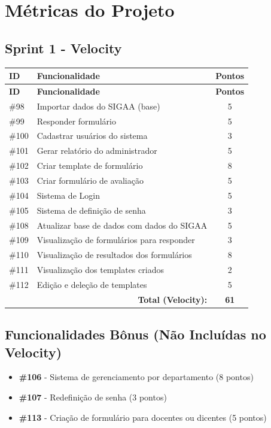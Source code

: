 \documentclass[a4paper,12pt]{article}
\begin{document}
\section{Métricas do Projeto}

\subsection{Sprint 1 - Velocity}
\begin{longtable}{|l|p{6cm}|c|}
\hline
\textbf{ID} & \textbf{Funcionalidade} & \textbf{Pontos} \\
\hline
\endfirsthead
\hline
\textbf{ID} & \textbf{Funcionalidade} & \textbf{Pontos} \\
\hline
\endhead
\#98 & Importar dados do SIGAA (base) & 5 \\
\#99 & Responder formulário & 5 \\
\#100 & Cadastrar usuários do sistema & 3 \\
\#101 & Gerar relatório do administrador & 5 \\
\#102 & Criar template de formulário & 8 \\
\#103 & Criar formulário de avaliação & 5 \\
\#104 & Sistema de Login & 5 \\
\#105 & Sistema de definição de senha & 3 \\
\#108 & Atualizar base de dados com dados do SIGAA & 5 \\
\#109 & Visualização de formulários para responder & 3 \\
\#110 & Visualização de resultados dos formulários & 8 \\
\#111 & Visualização dos templates criados & 2 \\
\#112 & Edição e deleção de templates & 5 \\
\hline
\multicolumn{2}{|r|}{\textbf{Total (Velocity):}} & \textbf{61} \\
\hline
\end{longtable}

\subsection{Funcionalidades Bônus (Não Incluídas no Velocity)}
\begin{itemize}
    \item \textbf{\#106} - Sistema de gerenciamento por departamento (8 pontos)
    \item \textbf{\#107} - Redefinição de senha (3 pontos)
    \item \textbf{\#113} - Criação de formulário para docentes ou dicentes (5 pontos)
\end{itemize}
\end{document}
